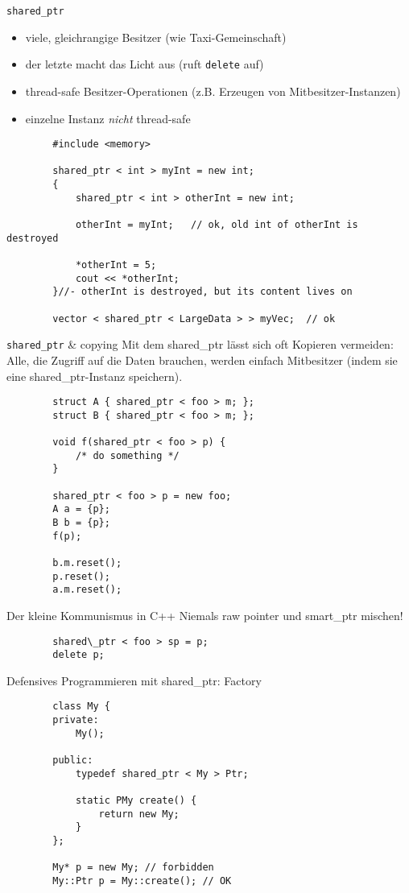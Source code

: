 \begin{frame}[fragile]{ \texttt{shared\_ptr} }
	\begin{itemize}
		\item viele, gleichrangige Besitzer (wie Taxi-Gemeinschaft)
		\item der letzte macht das Licht aus (ruft \texttt{delete} auf)
		\item thread-safe Besitzer-Operationen (z.B. Erzeugen von Mitbesitzer-Instanzen)
		\item einzelne Instanz \emph{nicht} thread-safe
	\end{itemize}
	
	\begin{lstlisting}
		#include <memory>
		
		shared_ptr < int > myInt = new int;
		{
			shared_ptr < int > otherInt = new int;
			
			otherInt = myInt;	// ok, old int of otherInt is destroyed
			
			*otherInt = 5;
			cout << *otherInt;
		}//- otherInt is destroyed, but its content lives on
		
		vector < shared_ptr < LargeData > > myVec;	// ok
	\end{lstlisting}
\end{frame}

\begin{frame}[fragile]{ \texttt{shared\_ptr} \& copying }
	Mit dem shared\_ptr lässt sich oft Kopieren vermeiden:\\
	Alle, die Zugriff auf die Daten brauchen, werden einfach Mitbesitzer (indem sie eine shared\_ptr-Instanz speichern).
	
	\begin{lstlisting}
		struct A { shared_ptr < foo > m; };
		struct B { shared_ptr < foo > m; };
		
		void f(shared_ptr < foo > p) {
			/* do something */
		}
		
		shared_ptr < foo > p = new foo;
		A a = {p};
		B b = {p};
		f(p);
		
		b.m.reset();
		p.reset();
		a.m.reset();
	\end{lstlisting}
\end{frame}

\begin{frame}[fragile]{Der kleine Kommunismus in C++}
	Niemals raw pointer und smart\_ptr mischen!
	
	\begin{lstlisting}
		shared\_ptr < foo > sp = p;
		delete p;
	\end{lstlisting}
	
	\pause
	
	Defensives Programmieren mit shared\_ptr: Factory
	
	\begin{lstlisting}
		class My {
		private:
			My();
			
		public:
			typedef shared_ptr < My > Ptr;
			
			static PMy create() {
				return new My;
			}
		};
		
		My* p = new My; // forbidden
		My::Ptr p = My::create(); // OK
	\end{lstlisting}
\end{frame}


